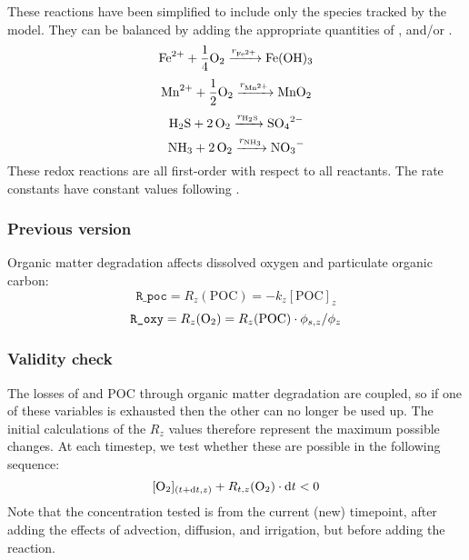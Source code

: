 \documentclass[a4paper]{article}
\newcommand{\D}[1]{\mathrm{d}#1}
\newcommand{\code}[1]{\texttt{#1}}
\begin{document}
These reactions have been simplified to include only the species tracked by the model.  They can be balanced by adding the appropriate quantities of ,  and/or .
\begin{equation}
  \ce{Fe^2+ + $\frac{1}{4}$O2 ->[$r_{\ce{Fe^2+}}$] Fe(OH)3}%
\end{equation}
\begin{equation}
  \ce{Mn^2+ + $\frac{1}{2}$O2 ->[$r_{\ce{Mn^2+}}$] MnO2}%
\end{equation}
\begin{equation}
  \ce{H2S + 2O2 ->[$r_{\ce{H2S}}$] SO4^2-}%
\end{equation}
\begin{equation}
  \ce{NH3 + 2O2 ->[$r_{\ce{NH3}}$] NO3-}%
\end{equation}
These redox reactions are all first-order with respect to all reactants.  The rate constants have constant values following \citet{boudreau_method_1996}.

\subsubsection{Previous version}

Organic matter degradation affects dissolved oxygen and particulate organic carbon:
\begin{equation}
\code{R\_poc} = R_z(\mathrm{POC}) = -k_z [\mathrm{POC}]_z
\end{equation}
\begin{equation}\label{r_O2}
\code{R\_oxy} = R_z(\ce{O2}) = R_z(\mathrm{POC}) \cdot \phi_{s,z} / \phi_z
\end{equation}


\subsubsection{Validity check}

The losses of  and POC through organic matter degradation are coupled, so if one of these variables is exhausted then the other can no longer be used up.  The initial calculations of the $R_z$ values therefore represent the maximum possible changes.  At each timestep, we test whether these are possible in the following sequence:
\begin{equation}\label{eq:om-o2loss-check}
[\ce{O2}]_{(t+\D{t}, z)} + R_{t,z}(\ce{O2}) \cdot \D{t} < 0
\end{equation}
Note that the  concentration tested is from the current (new) timepoint, after adding the effects of advection, diffusion, and irrigation, but before adding the reaction.
\end{document}
